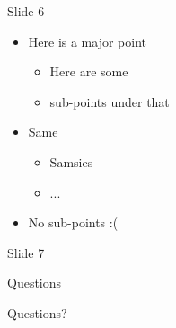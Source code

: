 \documentclass{beamer}
\begin{document}
\begin{frame}{Slide 6}\begin{center}
\begin{itemize}
\item Here is a major point
\begin{itemize}
\item Here are some
\item sub-points under that
\end{itemize}
\item Same
\begin{itemize}
\item Samsies
\item ...
\end{itemize}
\item No sub-points :(
\end{itemize}
\end{center}\end{frame}



\begin{frame}{Slide 7}\begin{center}
\end{center}\end{frame}

\begin{frame}{Questions}\begin{center}
\Huge Questions?
\end{center}\end{frame}
\end{document}
